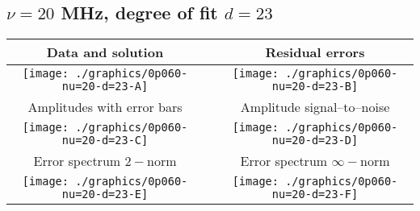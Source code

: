 

% 

\clearpage{}
\break{}

\subsection{$\nu = 20$ MHz, degree of fit $d = 23$}

\begin{table}[h]
    \begin{center}
        \begin{tabular}{ccc}
            Data and solution & \quad & Residual errors \\\hline
            \texttt{[image: ./graphics/0p060-nu=20-d=23-A]} &&
            \texttt{[image: ./graphics/0p060-nu=20-d=23-B]} \\[15pt]
            Amplitudes with error bars && Amplitude signal--to--noise \\\hline
            \texttt{[image: ./graphics/0p060-nu=20-d=23-C]} &&
            \texttt{[image: ./graphics/0p060-nu=20-d=23-D]} \\[15pt]
            Error spectrum $2-$norm && Error spectrum $\infty-$norm \\\hline
            \texttt{[image: ./graphics/0p060-nu=20-d=23-E]} &&
            \texttt{[image: ./graphics/0p060-nu=20-d=23-F]} \\[15pt]
        \end{tabular}
    \end{center}
\label{fig:elev=60, nu=20}
\end{table}



\endinput
